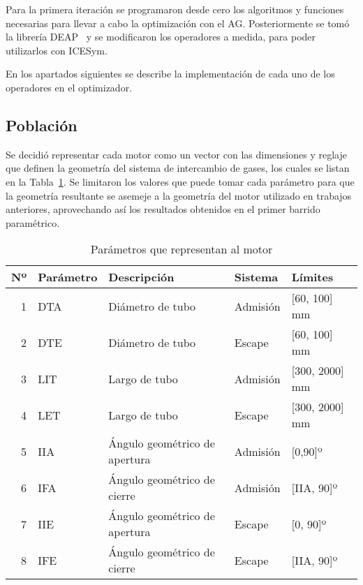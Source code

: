 Para la primera iteración se programaron desde cero los algoritmos y funciones
necesarias para llevar a cabo la optimización con el AG.
%
Posteriormente se tomó la librería DEAP~\parencite{DEAP_JMLR2012} y se
modificaron los operadores a medida, para poder utilizarlos con ICESym.

En los apartados siguientes se describe la implementación de cada uno de los
operadores en el optimizador.

\subsection{Población}
%
Se decidió representar cada motor como un vector con las dimensiones y reglaje
que definen la geometría del sistema de intercambio de gases, los cuales se
listan en la Tabla~\ref{tab:param_motor}.
%
Se limitaron los valores que puede tomar cada parámetro para que la geometría
resultante se asemeje a la geometría del motor utilizado en trabajos anteriores,
aprovechando así los resultados obtenidos en el primer barrido paramétrico.


\begin{table}[ht]
  \centering
  \begin{tabular}{rllll} \toprule
    Nº & Parámetro & Descripción & Sistema & Límites \\ \midrule
    1 & DTA & Diámetro de tubo & Admisión & [60, 100] mm \\
    2 & DTE & Diámetro de tubo & Escape & [60, 100] mm\\
    3 & LIT & Largo de tubo & Admisión & [300, 2000] mm\\
    4 & LET & Largo de tubo & Escape & [300, 2000] mm\\
    5 & IIA & Ángulo geométrico de apertura & Admisión & [0,90]º \\
    6 & IFA & Ángulo geométrico de cierre & Admisión & [IIA, 90]º \\
    7 & IIE & Ángulo geométrico de apertura & Escape & [0, 90]º \\
    8 & IFE & Ángulo geométrico de cierre & Escape & [IIA, 90]º \\ \bottomrule
  \end{tabular}
  \caption{Parámetros que representan al motor}\label{tab:param_motor}
\end{table}


